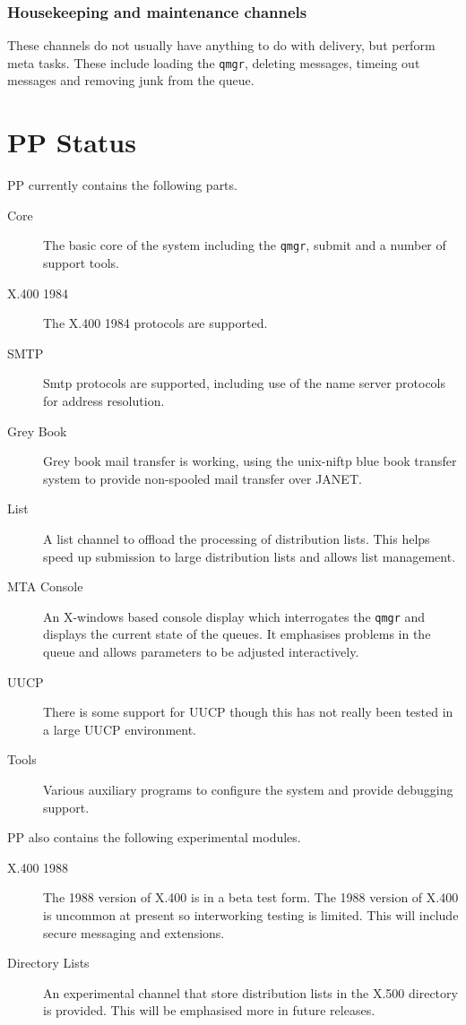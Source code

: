 \subsubsection{Housekeeping and maintenance channels}
These channels do not usually have anything to do with delivery, but
perform meta tasks. These include loading the \verb|qmgr|, deleting
messages, timeing out messages and removing junk from the queue.

\section{PP Status}

PP currently contains the following parts.

\begin{description}
\item[Core]	The basic core of the system including the \verb|qmgr|,
submit and a number of support tools.

\item[X.400 1984] The X.400 1984 protocols are supported.

\item[SMTP]	Smtp protocols are supported, including use of the
name server protocols for address resolution.

\item[Grey Book] Grey book mail transfer is working, using  the
unix-niftp blue book transfer system to provide non-spooled mail
transfer over JANET.

\item[List]	A list channel to offload the processing of
distribution lists. This helps speed up submission to large
distribution lists and allows list management.


\item[MTA Console]	An X-windows based console display which
interrogates the \verb|qmgr| and displays the current state of the
queues. It emphasises problems in the queue and allows parameters to
be adjusted interactively.

\item[UUCP] There is some support for UUCP though this has not really
been tested in a large UUCP environment.

\item[Tools]	Various auxiliary programs to configure the system and
provide debugging support.
 
\end{description}

PP also contains the following experimental modules.
\begin{description}
\item[X.400 1988]	The 1988 version of X.400 is in a beta test
form. The 1988 version of X.400 is uncommon at present so interworking
testing is limited. This will include secure messaging and extensions.

\item[Directory Lists] An experimental channel that store distribution
lists in the X.500 directory is provided. This will be emphasised more
in future releases.

\end{description}


